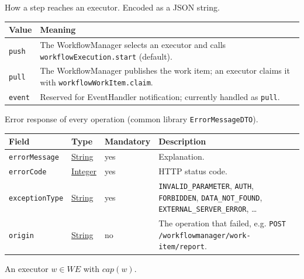 \documentclass[a4paper]{arrowhead}
\newcommand{\pref}[1]{{\textcolor{ArrowheadGrey}{\hyperref[sec:model:primitives:#1]{#1}}}}
\begin{document}
How a step reaches an executor.
 Encoded as a JSON string.
{\small
\begin{longtable}{|p{3.9cm}|p{11.9cm}|}

\hline
\rowcolor{gray!33} Value & Meaning \\ \hline
\endhead
\texttt{push} & The WorkflowManager selects an executor and calls \texttt{workflowExecution.start} (default). \\ \hline
\texttt{pull} & The WorkflowManager publishes the work item; an executor claims it with \texttt{workflowWorkItem.claim}. \\ \hline
\texttt{event} & Reserved for EventHandler notification; currently handled as \texttt{pull}. \\ \hline
\end{longtable}
}

Error response of every operation (common library \texttt{ErrorMessageDTO}).

{\small
\begin{longtable}{|p{3.7cm}|p{4.2cm}|p{1.6cm}|p{6.3cm}|}

\hline
\rowcolor{gray!33} Field & Type & Mandatory & Description \\ \hline
\endhead
\texttt{errorMessage} & \pref{String} & yes & Explanation. \\ \hline
\texttt{errorCode} & \pref{Integer} & yes & HTTP status code. \\ \hline
\texttt{exceptionType} & \pref{String} & yes & \texttt{INVALID\_PARAMETER}, \texttt{AUTH}, \texttt{FORBIDDEN}, \texttt{DATA\_NOT\_FOUND}, \texttt{EXTERNAL\_SERVER\_ERROR}, \ldots \\ \hline
\texttt{origin} & \pref{String} & no & The operation that failed, e.g. \texttt{POST /workflowmanager/work-item/report}. \\ \hline
\end{longtable}
}

An executor $w \in WE$ with $cap(w)$.
\end{document}
